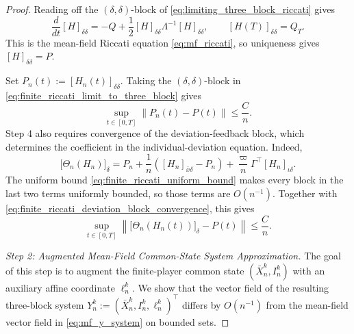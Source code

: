 \documentclass[12pt]{article}
\numberwithin{equation}{section}
\theoremstyle{definition}
\begin{document}
\begin{proof}
Reading off the \((\delta,\delta)\)-block of
\eqref{eq:limiting_three_block_riccati} gives
\begin{equation}\label{eq:limiting_riccati_deviation_block}
\frac{d}{dt}[H]_{\delta\delta}
=- Q
+\frac12[H]_{\delta\delta}\Lambda^{-1}
[H]_{\delta\delta},
\qquad
[H(T)]_{\delta\delta}=Q_T.
\end{equation}
This is the mean-field Riccati equation \eqref{eq:mf_riccati}, so uniqueness
gives \([H]_{\delta\delta}=P\).

Set \(P_n(t):=[H_n(t)]_{\delta\delta}\). Taking the
\((\delta,\delta)\)-block in
\eqref{eq:finite_riccati_limit_to_three_block} gives
\begin{equation}\label{eq:finite_riccati_deviation_block_convergence}
\sup_{t\in[0,T]}
\lVert P_n(t)-P(t)\rVert
\le\frac{C}{n}.
\end{equation}
Step 4 also requires convergence of the deviation-feedback block, which
determines the coefficient in the individual-deviation equation. Indeed,
\[
\bigl[\Theta_n(H_n)\bigr]_\delta
=
P_n
+\frac1n
\left(
[H_n]_{\bar x\delta}-P_n
\right)
+\frac{\varpi}{n}\Gamma^\top[H_n]_{\iota\delta}.
\]
The uniform bound \eqref{eq:finite_riccati_uniform_bound} makes every block
in the last two terms uniformly bounded, so those terms are \(O(n^{-1})\).
Together with \eqref{eq:finite_riccati_deviation_block_convergence}, this gives
\begin{equation}\label{eq:finite_theta_delta_convergence}
\sup_{t\in[0,T]}
\left\lVert
\bigl[\Theta_n(H_n(t))\bigr]_\delta-P(t)
\right\rVert
\le
\frac{C}{n}.
\end{equation}

\emph{Step 2: Augmented Mean-Field Common-State System Approximation.}
The goal of this step is to augment the finite-player common state
\((\bar X_n^k,I_n^k)\) with an auxiliary affine coordinate \(\ell_n^k\).
We show that the vector field of the resulting three-block system
\(Y_n^k:=(\bar X_n^k,I_n^k,\ell_n^k)^\top\) differs by \(O(n^{-1})\)
from the mean-field vector field in \eqref{eq:mf_y_system} on bounded sets.


\end{proof}
\end{document}
